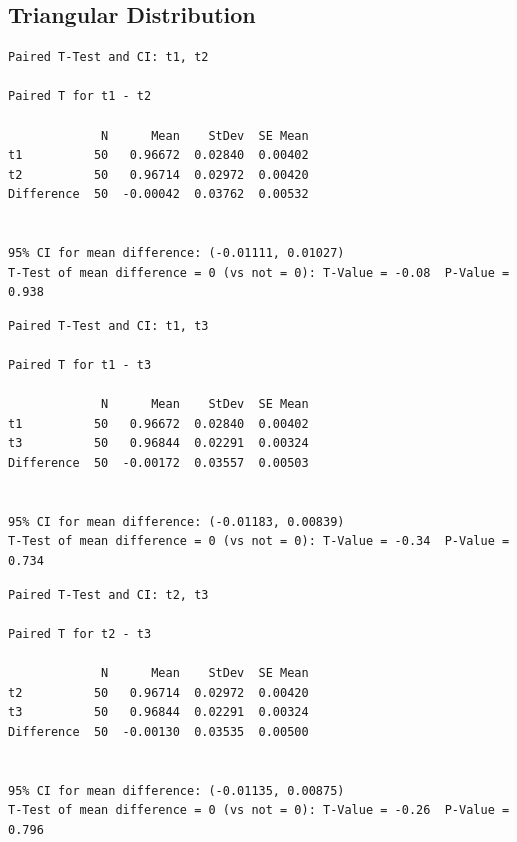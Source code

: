 \documentclass[letterpaper,10pt]{article}
\begin{document}
\subsection{Triangular Distribution}
\begin{samepage}
\begin{verbatim}
Paired T-Test and CI: t1, t2 

Paired T for t1 - t2

             N      Mean    StDev  SE Mean
t1          50   0.96672  0.02840  0.00402
t2          50   0.96714  0.02972  0.00420
Difference  50  -0.00042  0.03762  0.00532


95% CI for mean difference: (-0.01111, 0.01027)
T-Test of mean difference = 0 (vs not = 0): T-Value = -0.08  P-Value = 0.938
\end{verbatim}
\end{samepage}
\begin{samepage}
\begin{verbatim}
Paired T-Test and CI: t1, t3 

Paired T for t1 - t3

             N      Mean    StDev  SE Mean
t1          50   0.96672  0.02840  0.00402
t3          50   0.96844  0.02291  0.00324
Difference  50  -0.00172  0.03557  0.00503


95% CI for mean difference: (-0.01183, 0.00839)
T-Test of mean difference = 0 (vs not = 0): T-Value = -0.34  P-Value = 0.734
\end{verbatim}
\end{samepage}
\begin{samepage}
\begin{verbatim}
Paired T-Test and CI: t2, t3 

Paired T for t2 - t3

             N      Mean    StDev  SE Mean
t2          50   0.96714  0.02972  0.00420
t3          50   0.96844  0.02291  0.00324
Difference  50  -0.00130  0.03535  0.00500


95% CI for mean difference: (-0.01135, 0.00875)
T-Test of mean difference = 0 (vs not = 0): T-Value = -0.26  P-Value = 0.796
\end{verbatim}
\end{samepage}
\end{document}
